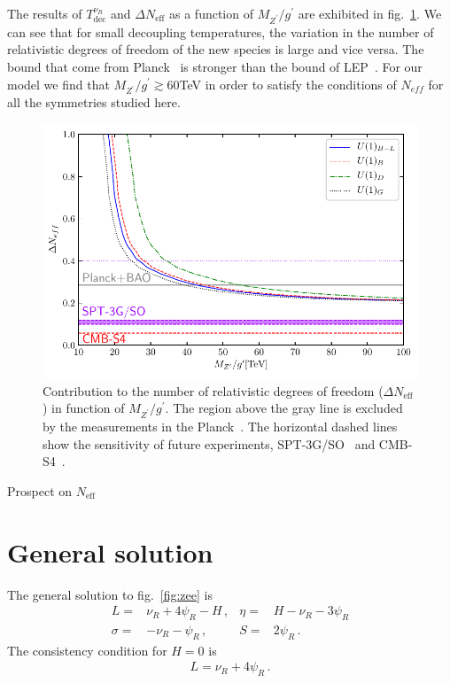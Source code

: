 \documentclass[12pt]{article}
\begin{document}
The results of $T^{\nu_R}_{\text{dec}}$ and $\Delta N_{\text{eff}}$ as a function of $M_{Z^{\prime}}/g^{\prime}$ are exhibited in fig.~\ref{fig:Neff}. We can see that for small decoupling temperatures, the variation in the number of relativistic degrees of freedom of the new species is large and vice versa. The bound that come from Planck~\cite{Aghanim:2018eyx} is stronger than the bound of LEP~\cite{Alioli:2017nzr}. For our model we find that $M_{Z^{\prime}}/g^{\prime} \gtrsim 60$TeV in order to satisfy the conditions of $N_{eff}$ for all the symmetries studied here.

%
\begin{figure}
\centering
\includegraphics[scale=0.8]{D_Neff.pdf}
\caption{Contribution to the number of relativistic degrees of freedom ($\Delta N_{\text{eff}}$) in function of $M_{Z^{\prime}}/g^{\prime}$. The region above the gray line is excluded by the measurements in the Planck~\cite{Aghanim:2018eyx}. The horizontal dashed lines show the sensitivity of future experiments, SPT-3G/SO~\cite{Benson:2014qhw} and CMB-S4~\cite{Abitbol:2019nhf}. }
\label{fig:Neff}
\end{figure}

Prospect on $N_{\text{eff}}$~\cite{Abazajian:2019oqj}

\appendix

\section{General solution}

The general solution to fig.~\ref{fig:zee} is
\begin{align}
  L=&\nu_R+4\psi_R -H \,,& \eta=& H-\nu_R-3\psi_R \nonumber\\
  \sigma=& -\nu_R-\psi_R\,,&S=& 2\psi_R \,.
\end{align}
The consistency condition for $H=0$ is
\begin{align}
  L=\nu_R+4\psi_R\,.
\end{align}
\end{document}
